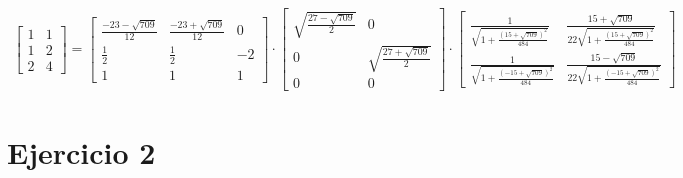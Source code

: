 \documentclass[a4paper, spanish]{article}
\begin{document}
    \begin{align}
      \begin{bmatrix}
        1 & 1\\
        1 & 2\\
        2 & 4
      \end{bmatrix}
      =
      \begin{bmatrix}
        \frac{-23-\sqrt{709}}{12} & \frac{-23+\sqrt{709}}{12} & 0 \\
        \frac{1}{2} & \frac{1}{2} & - 2 \\
        1 & 1 & 1
      \end{bmatrix}
      \cdot
      \begin{bmatrix}
        \sqrt{\frac{27 - \sqrt{709}}{2}} & 0 \\
        0 & \sqrt{\frac{27 + \sqrt{709}}{2}} \\
        0 & 0
      \end{bmatrix}
      \cdot
      \begin{bmatrix}
        \frac{1}{\sqrt{1 + \frac{(15 + \sqrt{709})^2}{484}}} &  \frac{15 + \sqrt{709}}{22\sqrt{1 + \frac{(15 + \sqrt{709})^2}{484}}}  \\
        \frac{1}{\sqrt{1 + \frac{(- 15 + \sqrt{709})^2}{484}}} & \frac{15 - \sqrt{709}}{22\sqrt{1 + \frac{(- 15 + \sqrt{709})^2}{484}}}
      \end{bmatrix}
    \end{align}


  \section{Ejercicio 2}
\end{document}
